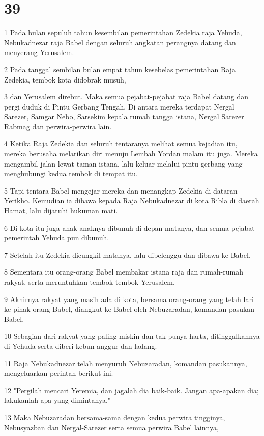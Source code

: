 \chapter{39}

\par 1 Pada bulan sepuluh tahun kesembilan pemerintahan Zedekia raja Yehuda, Nebukadnezar raja Babel dengan seluruh angkatan perangnya datang dan menyerang Yerusalem.
\par 2 Pada tanggal sembilan bulan empat tahun kesebelas pemerintahan Raja Zedekia, tembok kota didobrak musuh,
\par 3 dan Yerusalem direbut. Maka semua pejabat-pejabat raja Babel datang dan pergi duduk di Pintu Gerbang Tengah. Di antara mereka terdapat Nergal Sarezer, Samgar Nebo, Sarsekim kepala rumah tangga istana, Nergal Sarezer Rabmag dan perwira-perwira lain.
\par 4 Ketika Raja Zedekia dan seluruh tentaranya melihat semua kejadian itu, mereka berusaha melarikan diri menuju Lembah Yordan malam itu juga. Mereka mengambil jalan lewat taman istana, lalu keluar melalui pintu gerbang yang menghubungi kedua tembok di tempat itu.
\par 5 Tapi tentara Babel mengejar mereka dan menangkap Zedekia di dataran Yerikho. Kemudian ia dibawa kepada Raja Nebukadnezar di kota Ribla di daerah Hamat, lalu dijatuhi hukuman mati.
\par 6 Di kota itu juga anak-anaknya dibunuh di depan matanya, dan semua pejabat pemerintah Yehuda pun dibunuh.
\par 7 Setelah itu Zedekia dicungkil matanya, lalu dibelenggu dan dibawa ke Babel.
\par 8 Sementara itu orang-orang Babel membakar istana raja dan rumah-rumah rakyat, serta meruntuhkan tembok-tembok Yerusalem.
\par 9 Akhirnya rakyat yang masih ada di kota, bersama orang-orang yang telah lari ke pihak orang Babel, diangkut ke Babel oleh Nebuzaradan, komandan pasukan Babel.
\par 10 Sebagian dari rakyat yang paling miskin dan tak punya harta, ditinggalkannya di Yehuda serta diberi kebun anggur dan ladang.
\par 11 Raja Nebukadnezar telah menyuruh Nebuzaradan, komandan pasukannya, mengeluarkan perintah berikut ini.
\par 12 "Pergilah mencari Yeremia, dan jagalah dia baik-baik. Jangan apa-apakan dia; lakukanlah apa yang dimintanya."
\par 13 Maka Nebuzaradan bersama-sama dengan kedua perwira tingginya, Nebusyazban dan Nergal-Sarezer serta semua perwira Babel lainnya,
